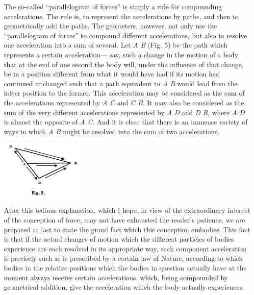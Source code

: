 The so-called ``parallelogram of forces'' is simply a rule for compounding accelerations. The rule is, to represent the accelerations by paths, and then to geometrically add the paths. The geometers, however, not only use the ``parallelogram of forces'' to compound different accelerations, but also to resolve one acceleration into a sum of several. Let \emph{A B} (Fig. 5) be the path which represents a certain acceleration--- say, such a change in the motion of a body that at the end of one second the body will, under the influence of that change, be in a position different from what it would have had if its motion had  continued unchanged such that a path equivalent to \emph{A B} would lead from the latter position to the former. This acceleration may be considered as the sum of the accelerations represented by \emph{A C} and \emph{C B.} It may also be considered as the sum of the very different accelerations represented by \emph{A D} and \emph{D B,} where \emph{A D} is almost the opposite of \emph{A C.} And it is clear that there is an immense variety of ways in which \emph{A B} might be resolved into the sum of two accelerations.

\centerline{\includegraphics[width=1.6in]{peirce-howto3.pdf}}

After this tedious explanation, which I hope, in view of the extraordinary interest of the conception of force, may not have exhausted the reader's patience, we are prepared at last to state the grand fact which this conception embodies. This fact is that if the actual changes of motion which the different particles of bodies experience are each resolved in its appropriate way, each component acceleration is precisely such as is prescribed by a certain law of Nature, according to which bodies in the relative positions which the bodies in question actually have at the moment always receive certain accelerations, which, being compounded by geometrical addition, give the acceleration which the body actually experiences.


